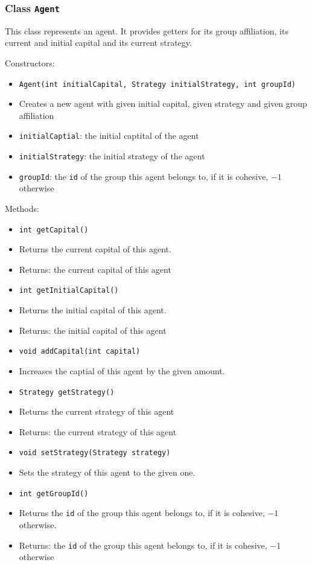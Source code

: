 \documentclass[parskip=full,11pt]{scrartcl}
\begin{document}
\subsubsection{Class \texttt{Agent}}
This class represents an agent. It provides getters for its group affiliation, its current and initial capital and its current strategy.

Constructors:
\begin{itemize}\itemsep -10pt
\item \texttt{Agent(int initialCapital, Strategy initialStrategy, int groupId)}
\item[] Creates a new agent with given initial capital, given strategy and given group affiliation
\item[] \texttt{initialCaptial}: the initial captital of the agent
\item[] \texttt{initialStrategy}: the initial strategy of the agent
\item[] \texttt{groupId}: the \texttt{id} of the group this agent belongs to, if it is cohesive, \(-1\) otherwise
\end{itemize}

Methods:
\begin{itemize}\itemsep -10pt
\item \texttt{int getCapital()}
\item[] Returns the current capital of this agent.
\item[] Returns: the current capital of this agent

\item \texttt{int getInitialCapital()}
\item[] Returns the initial capital of this agent.
\item[] Returns: the initial capital of this agent

\item \texttt{void addCapital(int capital)}
\item[] Increases the captial of this agent by the given amount.

\item \texttt{Strategy getStrategy()}
\item[] Returns the current strategy of this agent
\item[] Returns: the current strategy of this agent

\item\texttt{void setStrategy(Strategy strategy)}
\item[] Sets the strategy of this agent to the given one.

\item \texttt{int getGroupId()}
\item[] Returns the \texttt{id} of the group this agent belongs to, if it is cohesive, \(-1\) otherwise.
\item[] Returns: the \texttt{id} of the group this agent belongs to, if it is cohesive, \(-1\) otherwise
\end{itemize}
\end{document}
